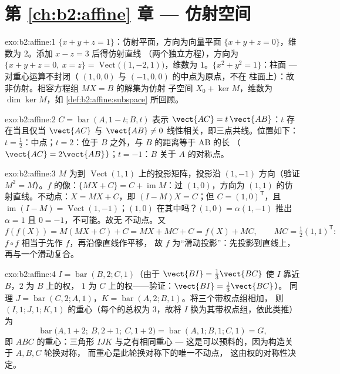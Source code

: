 \section*{第 \ref{ch:b2:affine} 章 --- 仿射空间}

\begin{solution}{exo:b2:affine:1}
$\{x + y + z = 1\}$：仿射平面，方向为向量平面 $\{x
+ y + z = 0\}$，维数为 $2$。添加 $x - z = 3$ 后得仿射直线
（两个独立方程），方向为 $\{x + y + z = 0,\ x = z\}
= \operatorname{Vect}\bigl((1, -2, 1)\bigr)$，维数为 $1$。$\{x^2
+ y^2 = 1\}$：柱面 --- 对重心运算不封闭（
$(1,0,0)$ 与 $(-1,0,0)$ 的中点为原点，不在
柱面上）：故非仿射。相容方程组 $MX = B$ 的解集为仿射
子空间 $X_0 + \ker M$，维数为 $\dim\ker M$，如
\cref{def:b2:affine:subspace} 所回顾。
\end{solution}

\begin{solution}{exo:b2:affine:2}
$C = \operatorname{bar}(A, 1-t; B, t)$ 表示 $\vect{AC} =
t\,\vect{AB}$：$t$ 存在当且仅当
$\vect{AC}$ 与 $\vect{AB} \neq 0$ 线性相关，即三点共线。位置如下：$t
= \frac12$：中点；$t = 2$：位于 $B$ 之外，与 $B$ 的距离等于 AB 的长
（$\vect{AC} = 2\vect{AB}$）；$t = -1$：$B$ 关于
$A$ 的对称点。
\end{solution}

\begin{solution}{exo:b2:affine:3}
$M$ 为到 $\operatorname{Vect}(1,1)$ 上的投影矩阵，投影沿
$(1,-1)$ 方向（验证 $M^2 = M$）。$f$ 的像：$\{MX + C\} = C +
\operatorname{im} M$：过 $(1,0)$，方向为
$(1,1)$ 的仿射直线。不动点：$X = MX + C$，即 $(I - M)X = C$；但 $C =
(1, 0)^{\mathsf T}$，且 $\operatorname{im}(I - M) =
\operatorname{Vect}(1,-1)$；$(1,0)$ 在其中吗？$(1, 0) =
\alpha(1,-1)$ 推出 $\alpha = 1$ 且 $0 = -1$，不可能。故无
不动点。又
\[
f(f(X)) = M(MX + C) + C = MX + MC + C = f(X) + MC,
\qquad MC = \tfrac12(1,1)^{\mathsf T} :
\]
$f\circ f$ 相当于先作 $f$，再沿像直线作平移，
故 $f$ 为“滑动投影”：先投影到直线上，
再与一个滑动复合。
\end{solution}

\begin{solution}{exo:b2:affine:4}
$I = \operatorname{bar}(B, 2; C, 1)$（由于 $\vect{BI} =
\frac13\vect{BC}$ 使 $I$ 靠近 $B$，$2$ 为 $B$ 上的权，
$1$ 为 $C$ 上的权——验证：$\vect{BI} = \frac{1}{3}\vect{BC}$）。
同理 $J = \operatorname{bar}(C, 2; A, 1)$，$K =
\operatorname{bar}(A, 2; B, 1)$。将三个带权点组相加，
则 $(I, 1; J, 1; K, 1)$ 的重心（每个的总权为
$3$，故将 $I$ 换为其带权点组，依此类推）为
\[
\operatorname{bar}\bigl(A, 1 + 2;\ B, 2 + 1;\ C, 1 + 2\bigr)
= \operatorname{bar}(A, 1; B, 1; C, 1) = G ,
\]
即 $ABC$ 的重心：三角形 $IJK$ 与之有相同重心 ---
这是可以预料的，因为构造关于 $A, B, C$ 轮换对称，
而重心是此轮换对称下的唯一不动点，
这由权的对称性决定。
\end{solution}

